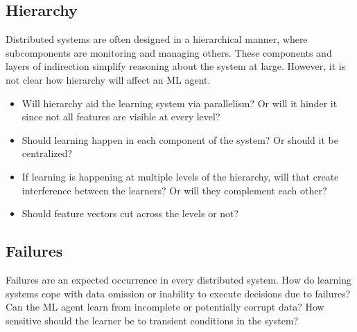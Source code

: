 \documentclass[a4paper,twocolumn]{article}
\begin{document}
\subsection*{Hierarchy}
Distributed systems are often designed in a hierarchical manner, where
subcomponents are monitoring and managing others. These components and layers of
indirection simplify reasoning about the system at large. However, it is not
clear how hierarchy will affect an ML agent.
\begin{itemize}
  \item Will hierarchy aid the learning system via parallelism? Or will it hinder
    it since not all features are visible at every level?
  \item Should learning happen in each component of the system? Or should it be
    centralized?
  \item If learning is happening at multiple levels of the hierarchy, will that
    create interference between the learners? Or will they complement each
    other?
   \item Should feature vectors cut across the levels or not?
\end{itemize}


\subsection*{Failures}

Failures are an expected occurrence in every distributed system. How do learning
systems cope with data omission or inability to execute decisions due to
failures? Can the ML agent learn from incomplete or potentially corrupt data?
How sensitive should the learner be to transient conditions in the system?

\end{document}
